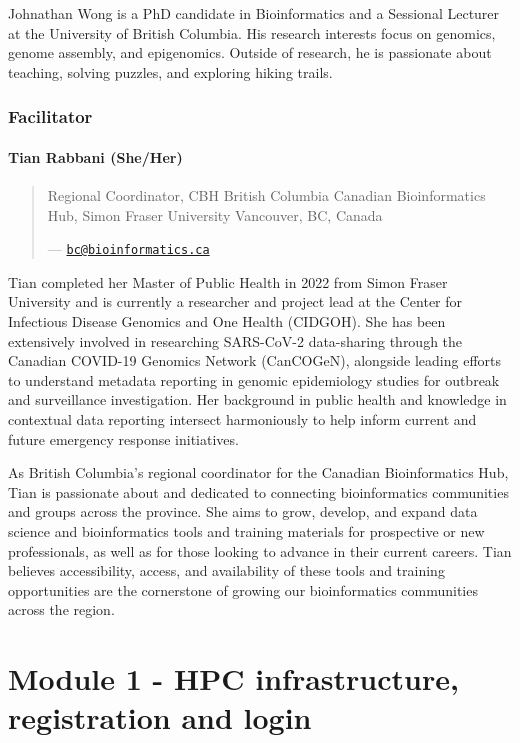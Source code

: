 \documentclass[
]{book}
\begin{document}
Johnathan Wong is a PhD candidate in Bioinformatics and a Sessional Lecturer at the University of British Columbia. His research interests focus on genomics, genome assembly, and epigenomics. Outside of research, he is passionate about teaching, solving puzzles, and exploring hiking trails.

\subsection{Facilitator}\label{facilitator}

\subsubsection{Tian Rabbani (She/Her)}\label{tian-rabbani-sheher}

\begin{quote}
Regional Coordinator, CBH British Columbia
Canadian Bioinformatics Hub, Simon Fraser University
Vancouver, BC, Canada

--- \href{mailto:bc@bioinformatics.ca}{\nolinkurl{bc@bioinformatics.ca}}
\end{quote}

Tian completed her Master of Public Health in 2022 from Simon Fraser University and is currently a researcher and project lead at the Center for Infectious Disease Genomics and One Health (CIDGOH). She has been extensively involved in researching SARS-CoV-2 data-sharing through the Canadian COVID-19 Genomics Network (CanCOGeN), alongside leading efforts to understand metadata reporting in genomic epidemiology studies for outbreak and surveillance investigation. Her background in public health and knowledge in contextual data reporting intersect harmoniously to help inform current and future emergency response initiatives.

As British Columbia's regional coordinator for the Canadian Bioinformatics Hub, Tian is passionate about and dedicated to connecting bioinformatics communities and groups across the province. She aims to grow, develop, and expand data science and bioinformatics tools and training materials for prospective or new professionals, as well as for those looking to advance in their current careers. Tian believes accessibility, access, and availability of these tools and training opportunities are the cornerstone of growing our bioinformatics communities across the region.

\chapter{Module 1 - HPC infrastructure, registration and login}\label{module-1---hpc-infrastructure-registration-and-login}
\end{document}
